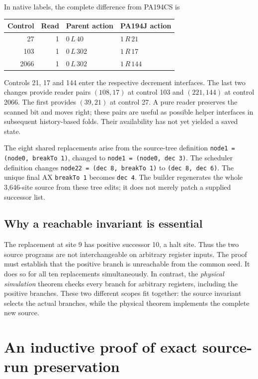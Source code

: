\documentclass[11pt,letterpaper]{article}
\newcommand{\file}[1]{\texttt{\nolinkurl{#1}}}
\begin{document}
In native labels, the complete difference from PA194CS is
\begin{center}
\begin{tabular}{@{}rrll@{}}
\toprule
Control & Read & Parent action & PA194J action\\
\midrule
27 & 1 & \(0\,L\,40\) & \(1\,R\,21\)\\
103 & 1 & \(0\,L\,302\) & \(1\,R\,17\)\\
2066 & 1 & \(0\,L\,302\) & \(1\,R\,144\)\\
\bottomrule
\end{tabular}
\end{center}
Controls 21, 17 and 144 enter the respective decrement interfaces.
The last two changes provide reader pairs \((108,17)\) at control 103
and \((221,144)\) at control 2066. The first provides \((39,21)\) at
control 27. A pure reader preserves the scanned bit and moves right;
these pairs are useful as possible helper interfaces in subsequent
history-based folds. Their availability has not yet yielded a saved state.

The eight shared replacements arise from the source-tree definition
\file{node1 = (node0, breakTo 1)}, changed to
\file{node1 = (node0, dec 3)}. The scheduler definition changes
\file{node22 = (dec 8, breakTo 1)} to \file{(dec 8, dec 6)}.
The unique final AX \file{breakTo 1} becomes \file{dec 4}.
The builder regenerates the whole 3,646-site source from these tree edits;
it does not merely patch a supplied successor list.

\subsection{Why a reachable invariant is essential}

The replacement at site 9 has positive successor 10, a halt site. Thus
the two source programs are not interchangeable on arbitrary register
inputs. The proof must establish that the positive branch is unreachable
from the common seed. It does so for all ten replacements simultaneously.
In contrast, the \emph{physical simulation} theorem checks every branch
for arbitrary registers, including the positive branches. These two
different scopes fit together: the source invariant selects the actual
branches, while the physical theorem implements the complete new source.

\section{An inductive proof of exact source-run preservation}
\label{sec:invariant}
\end{document}
